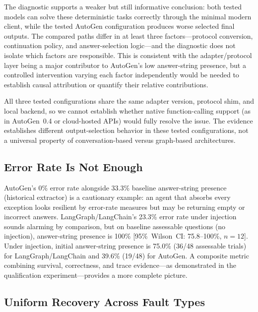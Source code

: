 \documentclass[make,article,submit,moreauthors,pdftex]{mdpi}
\begin{document}
{\color{green!50!black}The diagnostic supports a weaker but still informative conclusion: both tested models can solve these deterministic tasks correctly through the minimal modern client, while the tested AutoGen configuration produces worse selected final outputs. The compared paths differ in at least three factors---protocol conversion, continuation policy, and answer-selection logic---and the diagnostic does not isolate which factors are responsible. This is consistent with the adapter/protocol layer being a major contributor to AutoGen's low answer-string presence, but a controlled intervention varying each factor independently would be needed to establish causal attribution or quantify their relative contributions.}

{\color{green!50!black}All three tested configurations share the same adapter version, protocol shim, and local backend, so we cannot establish whether native function-calling support (as in AutoGen~0.4 or cloud-hosted APIs) would fully resolve the issue. The evidence establishes different output-selection behavior in these tested configurations, not a universal property of conversation-based versus graph-based architectures.}

\subsection{Error Rate Is Not Enough}

AutoGen's 0\% error rate alongside 33.3\% baseline answer-string presence (historical extractor) is a cautionary example: an agent that absorbs every exception looks resilient by error-rate measures but may be returning empty or incorrect answers. LangGraph/LangChain's 23.3\% error rate under injection sounds alarming by comparison, but on baseline assessable questions (no injection), answer-string presence is 100\% [95\%~Wilson~CI: 75.8--100\%, $n = 12$]. Under injection, initial answer-string presence is 75.0\% (36/48 assessable trials) for LangGraph/LangChain and 39.6\% (19/48) for AutoGen. A composite metric combining survival, correctness, and trace evidence---as demonstrated in the qualification experiment---provides a more complete picture.

\subsection{Uniform Recovery Across Fault Types}
\end{document}
